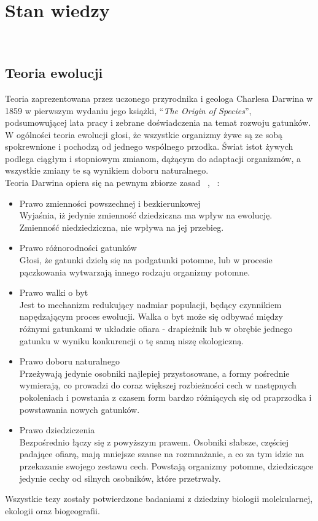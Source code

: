 \documentclass[twoside,a4paper,10]{book}
\begin{document}
\chapter{Stan wiedzy} ~\label{sec:chap1} 

\section{ Teoria ewolucji}
Teoria zaprezentowana przez uczonego przyrodnika i geologa Charlesa Darwina w 1859 w pierwszym wydaniu jego książki, \enquote{\textit{The Origin of Species}},  podsumowującej lata pracy i zebrane doświadczenia na temat rozwoju gatunków. 
W ogólności teoria ewolucji głosi, że wszystkie organizmy żywe są ze sobą spokrewnione i pochodzą od jednego wspólnego przodka. Świat istot żywych podlega ciągłym i stopniowym zmianom, dążącym do adaptacji organizmów, a wszystkie zmiany te są wynikiem doboru naturalnego.   ~\cite{darwin}
\\Teoria Darwina opiera się na pewnym zbiorze zasad  ~\cite{darwin},  ~\cite{darwinWeb}: 
\begin{itemize}
\item{   Prawo zmienności powszechnej i bezkierunkowej}\\
Wyjaśnia, iż jedynie zmienność dziedziczna ma wpływ na ewolucję. Zmienność niedziedziczna, nie wpływa na jej przebieg.
\item{  Prawo różnorodności gatunków}\\ Głosi, że gatunki dzielą się na podgatunki potomne, lub w procesie pączkowania wytwarzają innego rodzaju organizmy potomne.
\item{   Prawo walki o byt}\\ Jest to mechanizm redukujący nadmiar populacji, będący czynnikiem napędzającym proces ewolucji.  Walka o byt może się odbywać między różnymi gatunkami w układzie ofiara - drapieżnik lub w obrębie jednego gatunku w wyniku konkurencji o tę samą niszę ekologiczną. 
\item{    Prawo doboru naturalnego}
\\ Przeżywają  jedynie osobniki najlepiej przystosowane, a formy pośrednie wymierają, co prowadzi do coraz większej rozbieżności cech w następnych pokoleniach i powstania z czasem form bardzo różniących się od praprzodka i powstawania nowych gatunków.
\item{   Prawo dziedziczenia}
\\ Bezpośrednio łączy się z powyższym prawem. Osobniki słabsze, częściej padające ofiarą, mają mniejsze szanse na rozmnażanie, a co za tym idzie na przekazanie swojego zestawu cech. Powstają organizmy potomne, dziedziczące jedynie cechy od silnych osobników, które przetrwały. 
\end{itemize}
Wszystkie tezy zostały potwierdzone badaniami z dziedziny biologii molekularnej, ekologii oraz biogeografii. 
\end{document}
